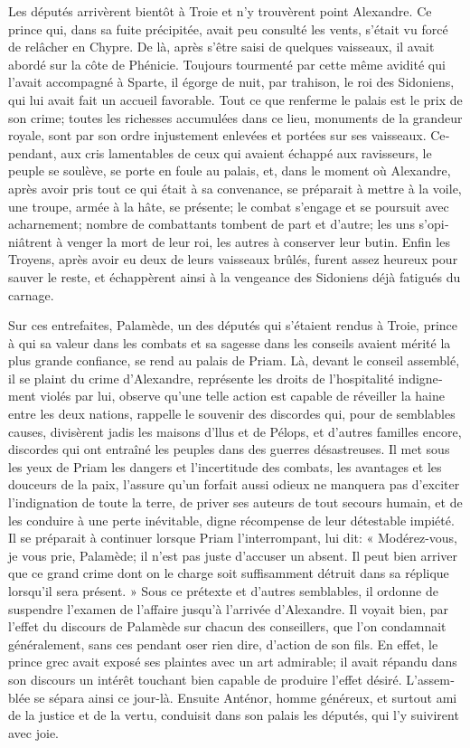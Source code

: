 \documentclass{article}
\begin{document}
\begin{pages}
\begin{Leftside}
\begin{french}
Les députés arrivèrent bientôt à Troie et n'y trouvèrent point Alexandre. Ce prince qui, dans sa fuite précipitée, avait peu consulté les vents, s'était vu forcé de relâcher en Chypre. De là, après s'être saisi de quelques vaisseaux, il avait abordé sur la côte de Phénicie. Toujours tourmenté par cette même avidité qui l'avait accompagné à Sparte, il égorge de nuit, par trahison, le roi des Sidoniens, qui lui avait fait un accueil favorable. Tout ce que renferme le palais est le prix de son crime; toutes les richesses accumulées dans ce lieu, monuments de la grandeur royale, sont par son ordre injustement enlevées et portées sur ses vaisseaux. Cependant, aux cris lamentables de ceux qui avaient échappé aux ravisseurs, le peuple se soulève, se porte en foule au palais, et, dans le moment où Alexandre, après avoir pris tout ce qui était à sa convenance, se préparait à mettre à la voile, une troupe, armée à la hâte, se présente; le combat s'engage et se poursuit avec acharnement; nombre de combattants tombent de part et d'autre; les uns s'opiniâtrent à venger la mort de leur roi, les autres à conserver leur butin. Enfin les Troyens, après avoir eu deux de leurs vaisseaux brûlés, furent assez heureux pour sauver le reste, et échappèrent ainsi à la vengeance des Sidoniens déjà fatigués du carnage.

Sur ces entrefaites, Palamède, un des députés qui s'étaient rendus à Troie, prince à qui sa valeur dans les combats et sa sagesse dans les conseils avaient mérité la plus grande confiance, se rend au palais de Priam. Là, devant le conseil assemblé, il se plaint du crime d'Alexandre, représente les droits de l'hospitalité indignement violés par lui, observe qu'une telle action est capable de réveiller la haine entre les deux nations, rappelle le souvenir des discordes qui, pour de semblables causes, divisèrent jadis les maisons d'llus et de Pélops, et d'autres familles encore, discordes qui ont entraîné les peuples dans des guerres désastreuses. Il met sous les yeux de Priam les dangers et l'incertitude des combats, les avantages et les douceurs de la paix, l'assure qu'un forfait aussi odieux ne manquera pas d'exciter l'indignation de toute la terre, de priver ses auteurs de tout secours humain, et de les conduire à une perte inévitable, digne récompense de leur détestable impiété. Il se préparait à continuer lorsque Priam l'interrompant, lui dit:
« Modérez-vous, je vous prie, Palamède; il n'est pas juste d'accuser un absent. Il peut bien arriver que ce grand crime dont on le charge soit suffisamment détruit dans sa réplique lorsqu'il sera présent. »
Sous ce prétexte et d'autres semblables, il ordonne de suspendre l'examen de l'affaire jusqu'à l'arrivée d'Alexandre. Il voyait bien, par l'effet du discours de Palamède sur chacun des conseillers, que l'on condamnait généralement, sans ces pendant oser rien dire, d'action de son fils. En effet, le prince grec avait exposé ses plaintes avec un art admirable; il avait répandu dans son discours un intérêt touchant bien capable de produire l'effet désiré. L'assemblée se sépara ainsi ce jour-là. Ensuite Anténor, homme généreux, et surtout ami de la justice et de la vertu, conduisit dans son palais les députés, qui l'y suivirent avec joie.


\end{french}
\end{Leftside}
\end{pages}
\end{document}
